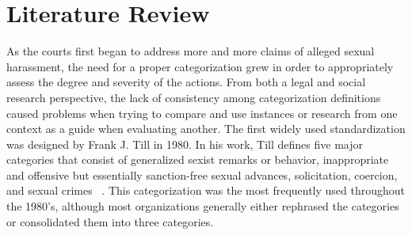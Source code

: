 \section{Literature Review}

As the courts first began to address more and more claims of alleged sexual harassment, the need for a proper categorization grew in order to appropriately assess the degree and severity of the actions. From both a legal and social research perspective, the lack of consistency among categorization definitions caused problems when trying to compare and use instances or research from one context as a guide when evaluating another. The first widely used standardization was designed by Frank J. Till in 1980. In his work, Till defines five major categories that consist of generalized sexist remarks or behavior, inappropriate and offensive but essentially sanction-free sexual advances, solicitation, coercion, and sexual crimes ~\cite{till}. This categorization was the most frequently used throughout the 1980's, although most organizations generally either rephrased the categories or consolidated them into three categories.

